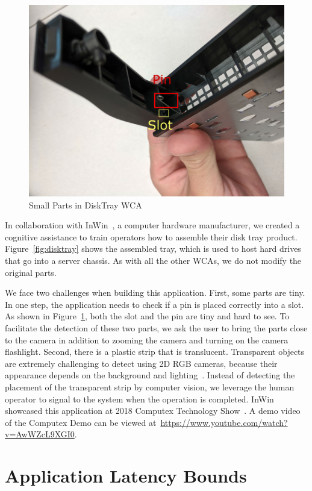\begin{figure}
\centering
\includegraphics[width=0.5\linewidth]{FIGS/disktray-challenge.jpg}
\caption{\small Small Parts in DiskTray WCA}
\label{fig:disktray-challenge}
\end{figure}

In collaboration with InWin~\cite{inwin}, a computer hardware manufacturer, we
created a cognitive assistance to train operators how to assemble their disk
tray product. Figure~\ref{fig:disktray} shows the assembled tray, which is used
to host hard drives that go into a server chassis. As with all the other WCAs,
we do not modify the original parts. 

We face two challenges when building this application. First, some parts are
tiny. In one step, the application needs to check if a pin is placed correctly
into a slot. As shown in Figure~\ref{fig:disktray-challenge}, both the slot and
the pin are tiny and hard to see. To facilitate the detection of these two
parts, we ask the user to bring the parts close to the camera in addition to
zooming the camera and turning on the camera flashlight. Second, there is a
plastic strip that is translucent. Transparent objects are extremely challenging
to detect using 2D RGB cameras, because their appearance depends on the
background and lighting~\cite{lysenkov2013recognition}. Instead of detecting the
placement of the transparent strip by computer vision, we leverage the human
operator to signal to the system when the operation is completed. InWin
showcased this application at 2018 Computex Technology Show~\cite{computex}. A
demo video of the Computex Demo can be viewed
at~\url{https://www.youtube.com/watch?v=AwWZcL9XGI0}.


\section{Application Latency Bounds}

